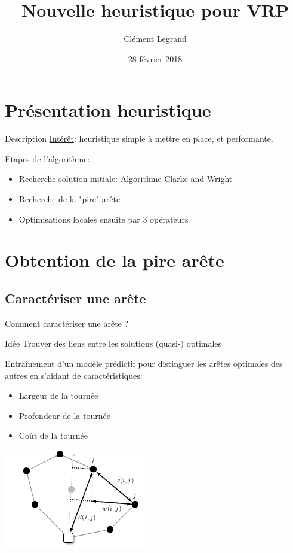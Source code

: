 \documentclass{beamer}
\title{Nouvelle heuristique pour VRP}
\author{Clément Legrand}
\date{28 février 2018}
\begin{document}
\section{Présentation heuristique}

\begin{frame}[plain]
\titlepage
\end{frame}

\begin{frame}{Description}
\underline{Intérêt}: heuristique simple à mettre en place, et performante.

\begin{block}{Etapes de l'algorithme:}
\begin{itemize}
\item Recherche solution initiale: Algorithme Clarke and Wright

\item Recherche de la "pire" arête

\item Optimisations locales ensuite par 3 opérateurs
\end{itemize}
\end{block}

\end{frame}

\section{Obtention de la pire arête}

\subsection{Caractériser une arête}

\begin{frame}{Comment caractériser une arête ?}
\begin{block}{Idée}
Trouver des liens entre les solutions (quasi-) optimales
\end{block}

Entraînement d'un modèle prédictif pour distinguer
les arêtes optimales des autres en s'aidant de caractéristiques:
\begin{itemize}
\item Largeur de la tournée
\item Profondeur de la tournée
\item Coût de la tournée
\end{itemize}

	\centering
	\includegraphics[height=0.4\textheight]{metrics.png}
	
\end{frame}
\end{document}
